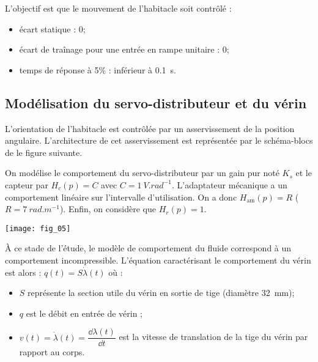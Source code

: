 \begin{obj}
L'objectif est que le mouvement de l'habitacle soit contrôlé :
\begin{itemize}
\item écart statique : 0\degres;
\item écart de traînage pour une entrée en rampe unitaire : 0\degres;
\item temps de réponse à 5\% : inférieur à \SI{0,1}{s}.

\end{itemize}
\end{obj}

\subsection*{Modélisation du servo-distributeur et du vérin}

L'orientation de l'habitacle est contrôlée par un asservissement de la position angulaire. L'architecture de cet asservissement est représentée par le schéma-blocs de le figure suivante.

On modélise le comportement du servo-distributeur par un gain pur noté $K_s$ et le capteur par $H_c(p)=C$ avec $C=\SI{1}{V.rad^{-1}}$.  L'adaptateur mécanique a un comportement linéaire sur l'intervalle d'utilisation. On a donc $H_{\text{am}}(p)=R$ ($R=\SI{7}{rad.m^{-1}}$). Enfin, on considère que $H_r(p)=1$. 

\begin{center}
\texttt{[image: fig\_05]}
\end{center}

À ce stade de l'étude, le modèle de comportement du fluide correspond à un comportement incompressible. L'équation caractérisant le comportement du vérin est alors : $q(t)=S\dot{\lambda}(t)$ où :
\begin{itemize}
\item $S$ représente la section utile du vérin en sortie de tige (diamètre \SI{32}{mm});
\item $q$ est le débit en entrée de vérin ;
\item $v(t)=\dot{\lambda}(t)=\dfrac{\dd \lambda(t) }{\dd t}$ est la vitesse de translation de la tige du vérin par rapport au corps.
\end{itemize}
% 
\fi

